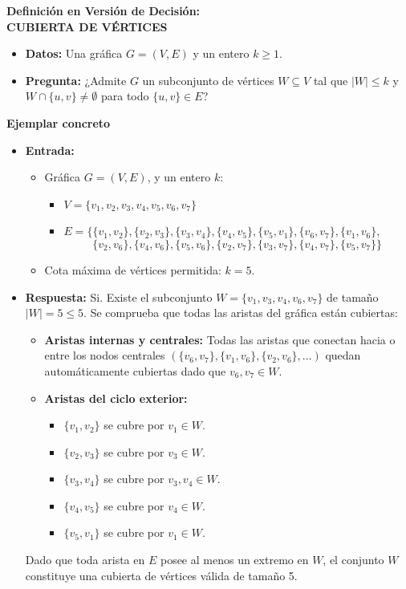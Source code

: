 \begin{enumerate}
    \textbf{Definición en Versión de Decisión:}\\
        \textbf{CUBIERTA DE VÉRTICES}
    \begin{itemize}
    \item \textbf{Datos:} Una gráfica $G = (V, E)$ y un entero $k \ge 1$.
    \item \textbf{Pregunta:} ¿Admite $G$ un subconjunto de vértices $W \subseteq V$ tal que $|W| \le k$ y $W \cap \{u, v\} \neq \emptyset$ para todo $\{u, v\} \in E$?
\end{itemize}
    
    \textbf{Ejemplar concreto}\\
    \begin{itemize}
    \item \textbf{Entrada:}
    \begin{itemize}
        \item Gráfica $G = (V, E)$, y un entero $k$:
        \begin{itemize}
            \item $V = \{v_1, v_2, v_3, v_4, v_5, v_6, v_7\}$
            \item $E = \{ \{v_1, v_2\}, \{v_2, v_3\}, \{v_3, v_4\}, \{v_4, v_5\}, \{v_5, v_1\}, \{v_6, v_7\}, \{v_1, v_6\},$
            $$ \{v_2, v_6\}, \{v_4, v_6\}, \{v_5, v_6\}, \{v_2, v_7\}, \{v_3, v_7\}, \{v_4, v_7\}, \{v_5, v_7\} \}$$
        \end{itemize}
        \item Cota máxima de vértices permitida: $k = 5$.
    \end{itemize}

    \item \textbf{Respuesta:} Si.
    Existe el subconjunto $W = \{v_1, v_3, v_4, v_6, v_7\}$ de tamaño $|W| = 5 \le 5$. Se comprueba que todas las aristas del gráfica están cubiertas:
    \begin{itemize}
        \item \textbf{Aristas internas y centrales:} Todas las aristas que conectan hacia o entre los nodos centrales $(\{v_6, v_7\}, \{v_1, v_6\}, \{v_2, v_6\}, \dots)$ quedan automáticamente cubiertas dado que $v_6, v_7 \in W$.
        \item \textbf{Aristas del ciclo exterior:}
        \begin{itemize}
            \item $\{v_1, v_2\}$ se cubre por $v_1 \in W$.
            \item $\{v_2, v_3\}$ se cubre por $v_3 \in W$.
            \item $\{v_3, v_4\}$ se cubre por $v_3, v_4 \in W$.
            \item $\{v_4, v_5\}$ se cubre por $v_4 \in W$.
            \item $\{v_5, v_1\}$ se cubre por $v_1 \in W$.
        \end{itemize}
    \end{itemize}
    Dado que toda arista en $E$ posee al menos un extremo en $W$, el conjunto $W$ constituye una cubierta de vértices válida de tamaño 5.
\end{itemize}
    

\end{enumerate}
